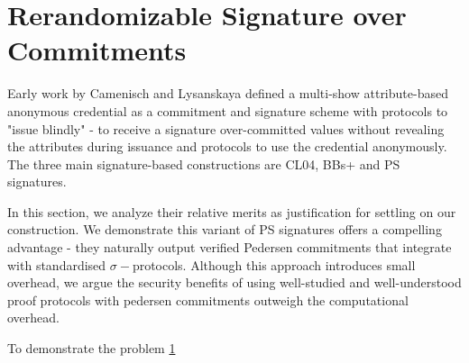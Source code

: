 % 
% 















% 
% 
\newpage
\section{Rerandomizable Signature over Commitments}
Early work by Camenisch and Lysanskaya defined a multi-show attribute-based anonymous credential as a commitment and signature scheme with protocols to "issue blindly" - to receive a signature over-committed values without revealing the attributes during issuance and protocols to use the credential anonymously. The three main signature-based constructions are CL04, BBs+ and PS signatures. 

\noindent In this section, we analyze their relative merits as justification for settling on our construction. We demonstrate this variant of PS signatures offers a compelling advantage - they naturally output verified Pedersen commitments that integrate with standardised $\sigma-$protocols. Although this approach introduces small overhead, we argue the security benefits of using well-studied and well-understood proof protocols with pedersen commitments outweigh the computational overhead. 

To demonstrate the problem \ref{}




















